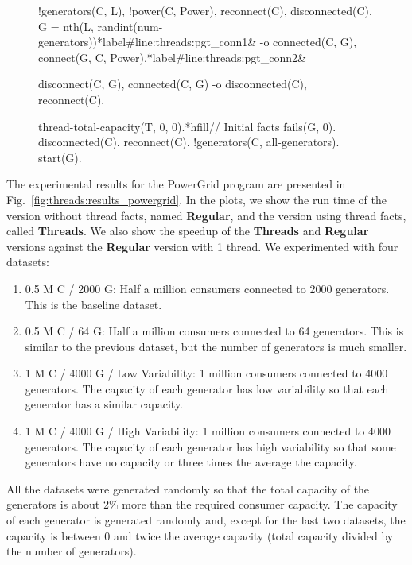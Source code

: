 \begin{figure}[h!]
\begin{LineCode}[fontsize=\scriptsize,commandchars=*\#\&]
!generators(C, L), !power(C, Power), reconnect(C), disconnected(C), G = nth(L, randint(num-generators))*label#line:threads:pgt_conn1&
   -o connected(C, G), connect(G, C, Power).*label#line:threads:pgt_conn2&

disconnect(C, G), connected(C, G)
   -o disconnected(C), reconnect(C).

thread-total-capacity(T, 0, 0).*hfill// Initial facts
fails(G, 0).  disconnected(C).  reconnect(C).  !generators(C, all-generators).  start(G).
\end{LineCode}
\label{code:threads:powergridt}
\end{figure}

The experimental results for the PowerGrid program are presented in
Fig.~\ref{fig:threads:results_powergrid}. In the plots, we show the run time of
the version without thread facts, named \textbf{Regular}, and the version using
thread facts, called \textbf{Threads}. We also show the speedup of the
\textbf{Threads} and \textbf{Regular} versions against the \textbf{Regular}
version with 1 thread.  We experimented with four datasets:

\begin{enumerate}
      \item 0.5 M C / 2000 G: Half a million consumers connected to 2000
         generators. This is the baseline dataset.

      \item 0.5 M C / 64 G: Half a million consumers connected to 64
         generators. This is similar to the previous dataset, but the number of
         generators is much smaller.

      \item 1 M C / 4000 G / Low Variability: 1 million consumers connected to
         4000 generators. The capacity of each generator has low variability so
         that each generator has a similar capacity.

      \item 1 M C / 4000 G / High Variability: 1 million consumers connected to
         4000 generators. The capacity of each generator has high variability so
         that some generators have no capacity or three times the average the
         capacity.

\end{enumerate}

All the datasets were generated randomly so that the total capacity of the
generators is about 2\% more than the required consumer capacity. The capacity
of each generator is generated randomly and, except for the last two datasets,
the capacity is between 0 and twice the average capacity (total capacity divided
by the number of generators).

